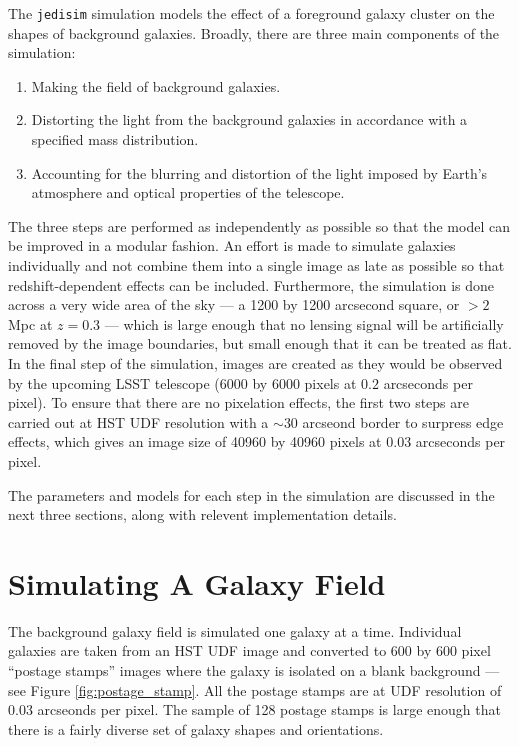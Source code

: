 \documentclass[10pt,twoside]{article}
\theoremstyle{definition}
\theoremstyle{exercise}
\begin{document}
The \texttt{jedisim} simulation models the effect of a foreground galaxy cluster on the shapes of background galaxies. Broadly, there are three main components of the simulation:
\begin{enumerate}
  \item Making the field of background galaxies.
  \item Distorting the light from the background galaxies in accordance with a specified mass distribution.
  \item Accounting for the blurring and distortion of the light imposed by Earth's atmosphere and optical properties of the telescope.
\end{enumerate}
The three steps are performed as independently as possible so that the model can be improved in a modular fashion. An effort is made to simulate galaxies individually and not combine them into a single image as late as possible so that redshift-dependent effects can be included. Furthermore, the simulation is done across a very wide area of the sky --- a 1200 by 1200 arcsecond square, or $>2$ Mpc at $z = 0.3$ --- which is large enough that no lensing signal will be artificially removed by the image boundaries, but small enough that it can be treated as flat. In the final step of the simulation, images are created as they would be observed by the upcoming LSST telescope (6000 by 6000 pixels at $0.2$ arcseconds per pixel). To ensure that there are no pixelation effects, the first two steps are carried out at HST UDF resolution with a $\sim30$ arcseond border to surpress edge effects, which gives an image size of 40960 by 40960 pixels at $0.03$ arcseconds per pixel. 

The parameters and models for each step in the simulation are discussed in the next three sections, along with relevent implementation details. 

\section{Simulating A Galaxy Field}
\label{sec:background}
The background galaxy field is simulated one galaxy at a time. Individual galaxies are taken from an HST UDF image and converted to 600 by 600 pixel ``postage stamps'' images where the galaxy is isolated on a blank background --- see Figure \ref{fig:postage_stamp}.  All the postage stamps are at UDF resolution of 0.03 arcseonds per pixel. The sample of 128 postage stamps is large enough that there is a fairly diverse set of galaxy shapes and orientations.
\end{document}
